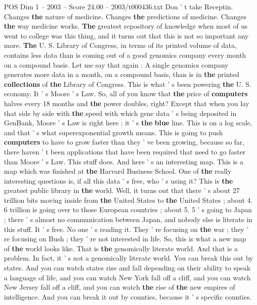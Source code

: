 \begin{textsample}{POS Dim 1 – 2003 – Score 24.00 – 2003/t000436.txt}
Don ' t take Receptin.
Changes \textbf{the} nature of medicine.
Changes \textbf{the} predictions of medicine.
Changes \textbf{the} way medicine works. \textbf{The} greatest repository of knowledge when most of us went to college was this thing, and it turns out that this is not so important any more. \textbf{The} U.
S.
Library of Congress, in terms of its printed volume of data, contains less data than is coming out of a good genomics company every month on a compound basis.
Let me say that again : A single genomics company generates more data in a month, on a compound basis, than is in \textbf{the} printed \textbf{collections} of \textbf{the} Library of Congress.
This is what ' s been powering \textbf{the} U.
S. economy.
It ' s Moore ' s Law.
So, all of you know that \textbf{the} price of \textbf{computers} halves every 18 months and \textbf{the} power doubles, right?
Except that when you lay that side by side with \textbf{the} speed with which gene data ' s being deposited in GenBank, Moore ' s Law is right here : it ' s \textbf{the} \textbf{blue} line.
This is on a log scale, and that ' s what superexponential growth means.
This is going to push \textbf{computers} to have to grow faster than they ' ve been growing, because so far, there haven ' t been applications that have been required that need to go faster than Moore ' s Law.
This stuff does.
And here ' s an interesting map.
This is a map which was finished at \textbf{the} Harvard Business School.
One of \textbf{the} really interesting questions is, if all this data ' s free, who ' s using it?
This is \textbf{the} greatest public library in \textbf{the} world.
Well, it turns out that there ' s about 27 trillion bits moving inside from \textbf{the} United States to \textbf{the} United States ; about 4. 6 trillion is going over to those European countries ; about 5. 5 ' s going to Japan ; there ' s almost no communication between Japan, and nobody else is literate in this stuff.
It ' s free.
No one ' s reading it.
They ' re focusing on \textbf{the} war ; they ' re focusing on Bush ; they ' re not interested in life.
So, this is what a new map of \textbf{the} world looks like.
That is \textbf{the} genomically literate world.
And that is a problem.
In fact, it ' s not a genomically literate world.
You can break this out by states.
And you can watch states rise and fall depending on their ability to speak a language of life, and you can watch New York fall off a cliff, and you can watch New Jersey fall off a cliff, and you can watch \textbf{the} rise of \textbf{the} new empires of intelligence.
And you can break it out by counties, because it ' s specific counties.

\end{textsample}
